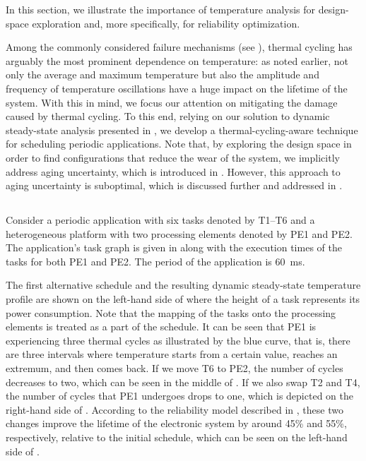 In this section, we illustrate the importance of temperature analysis for
design-space exploration and, more specifically, for reliability optimization.

Among the commonly considered failure mechanisms (see ),
thermal cycling has arguably the most prominent dependence on temperature: as
noted earlier, not only the average and maximum temperature but also the
amplitude and frequency of temperature oscillations have a huge impact on the
lifetime of the system. With this in mind, we focus our attention on mitigating
the damage caused by thermal cycling. To this end, relying on our solution to
dynamic steady-state analysis presented in , we
develop a thermal-cycling-aware technique for scheduling periodic applications.
Note that, by exploring the design space in order to find configurations that
reduce the wear of the system, we implicitly address aging uncertainty, which is
introduced in . However, this approach to aging
uncertainty is suboptimal, which is discussed further and addressed in
.

\subsection{\motivationtitle}

Consider a periodic application with six tasks denoted by T1--T6 and a
heterogeneous platform with two processing elements denoted by PE1 and PE2. The
application's task graph is given in  along with
the execution times of the tasks for both PE1 and PE2. The period of the
application is 60~ms.

The first alternative schedule and the resulting dynamic steady-state
temperature profile are shown on the left-hand side of
 where the height of a task represents its power
consumption. Note that the mapping of the tasks onto the processing elements is
treated as a part of the schedule. It can be seen that PE1 is experiencing three
thermal cycles as illustrated by the blue curve, that is, there are three
intervals where temperature starts from a certain value, reaches an extremum,
and then comes back. If we move T6 to PE2, the number of cycles decreases to
two, which can be seen in the middle of . If we
also swap T2 and T4, the number of cycles that PE1 undergoes drops to one, which
is depicted on the right-hand side of . According
to the reliability model described in , these two
changes improve the lifetime of the electronic system by around 45\% and 55\%,
respectively, relative to the initial schedule, which can be seen on the
left-hand side of .

